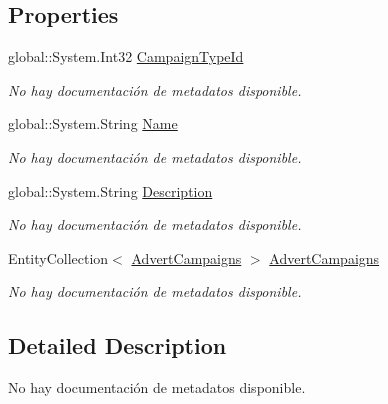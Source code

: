 \subsection*{Properties}
\begin{DoxyCompactItemize}
\item 
global\-::\-System.\-Int32 \hyperlink{class_game_memory_1_1_campaign_types_ab534e8f9389bed7b5d6ecb86a17518b8}{Campaign\-Type\-Id}
\begin{DoxyCompactList}\small\item\em No hay documentación de metadatos disponible. \end{DoxyCompactList}\item 
global\-::\-System.\-String \hyperlink{class_game_memory_1_1_campaign_types_a24dabf7fdd3c80cd369958be0e7b846d}{Name}
\begin{DoxyCompactList}\small\item\em No hay documentación de metadatos disponible. \end{DoxyCompactList}\item 
global\-::\-System.\-String \hyperlink{class_game_memory_1_1_campaign_types_a10d33d848dc2aaefd8e83d501579e172}{Description}
\begin{DoxyCompactList}\small\item\em No hay documentación de metadatos disponible. \end{DoxyCompactList}\item 
Entity\-Collection$<$ \hyperlink{class_game_memory_1_1_advert_campaigns}{Advert\-Campaigns} $>$ \hyperlink{class_game_memory_1_1_campaign_types_a7ce779c5a0e20b2b0a1270306afda16d}{Advert\-Campaigns}
\begin{DoxyCompactList}\small\item\em No hay documentación de metadatos disponible. \end{DoxyCompactList}\end{DoxyCompactItemize}


\subsection{Detailed Description}
No hay documentación de metadatos disponible. 



